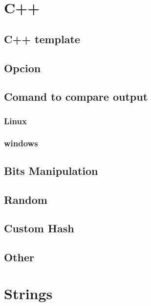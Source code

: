 
\section{C++}
\subsection{C++ template}
\raggedbottom
\hrulefill
\subsection{Opcion}
\raggedbottom
\hrulefill
\subsection{Comand to compare output}
\subsubsection{Linux}
\raggedbottom
\subsubsection{windows}
\raggedbottom

\hrulefill
\subsection{Bits Manipulation}
\raggedbottom
\hrulefill
\subsection{Random}
\raggedbottom
\hrulefill
\subsection{Custom Hash}
\raggedbottom
\hrulefill
\subsection{Other}
\raggedbottom
\hrulefill

\section{Strings}
